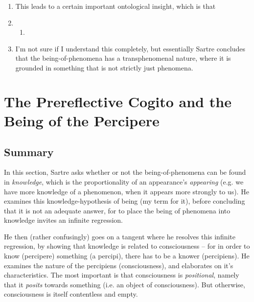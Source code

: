 \begin{enumerate}
\begin{enumerate}
  \end{enumerate}
  \item This leads to a certain important ontological insight, which is that \emph{}
  \item {}
  \begin{enumerate}
    \item {}
  \end{enumerate}
  \item I'm not sure if I understand this completely, but essentially Sartre concludes that the being-of-phenomena has a transphenomenal nature, where it is grounded in something that is not strictly just phenomena.
\end{enumerate}

\section{The Prereflective Cogito and the Being of the Percipere}

\subsection*{Summary}
In this section, Sartre asks whether or not the being-of-phenomena can be found in \emph{knowledge}, which is the proportionality of an appearance's \emph{appearing} (e.g. we have more knowledge of a phenomenon, when it appears more strongly to us). He examines this knowledge-hypothesis of being (my term for it), before concluding that it is not an adequate answer, for to place the being of phenomena into knowledge invites an infinite regression.

He then (rather confusingly) goes on a tangent where he resolves this infinite regression, by showing that knowledge is related to consciousness -- for in order to know (percipere) something (a percipi), there has to be a knower (percipiens).
He examines the nature of the percipiens (consciousness), and elaborates on it's characteristics. The most important is that consciousness is \emph{positional}, namely that it \emph{posits} towards something (i.e. an object of consciousness). But otherwise, consciousness is itself contentless and empty.


